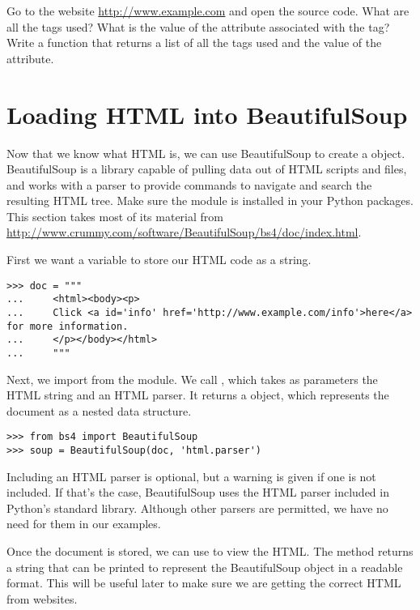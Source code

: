\begin{problem}
Go to the website \url{http://www.example.com} and open the source code.
What are all the tags used?
What is the value of the  attribute associated with the  tag?
Write a function that returns a list of all the tags used and the value of the  attribute. 
\end{problem}

\section*{Loading HTML into BeautifulSoup}
Now that we know what HTML is, we can use BeautifulSoup to create a  object.
BeautifulSoup is a library capable of pulling data out of HTML scripts and files, and works with a parser to provide commands to navigate and search the resulting HTML tree.
Make sure the module  is installed in your Python packages.
This section takes most of its material from \url{http://www.crummy.com/software/BeautifulSoup/bs4/doc/index.html}.

First we want a variable to store our HTML code as a string.
\begin{lstlisting}
>>> doc = """
...     <html><body><p>
...     Click <a id='info' href='http://www.example.com/info'>here</a> for more information.
...     </p></body></html>
...     """
\end{lstlisting}

Next, we import  from the  module.
We call , which takes as parameters the HTML string and an HTML parser. 
It returns a  object, which represents the document as a nested data structure.
\begin{lstlisting}
>>> from bs4 import BeautifulSoup
>>> soup = BeautifulSoup(doc, 'html.parser')
\end{lstlisting}

Including an HTML parser is optional, but a warning is given if one is not included.
If that's the case, BeautifulSoup uses the HTML parser included in Python's standard library.
Although other parsers are permitted, we have no need for them in our examples.

Once the document is stored, we can use  to view the HTML.
The  method returns a string that can be printed to represent the BeautifulSoup object in a readable format.
This will be useful later to make sure we are getting the correct HTML from websites.

